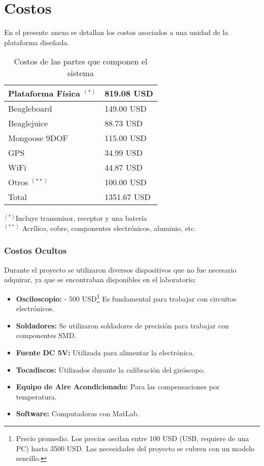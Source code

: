 \documentclass[main]{subfiles}
\begin{document}
\chapter{Costos}
\label{chap:anexo_costos}
En el presente anexo se detallan los costos asociados a una unidad de la plataforma dise\~nada. 

\begin{table}[H]
\begin{center}
\begin{tabular}{|p{5cm}|p{3cm}|}
\hline
Plataforma F\'isica $^{(*)}$  & 819.08 USD  \\
\hline
Beagleboard & 149.00 USD \\
\hline
Beaglejuice & 88.73 USD\\
\hline 
Mongoose 9DOF & 115.00 USD\\
\hline
GPS & 34.99 USD\\
\hline
WiFi & 44.87 USD\\
\hline
Otros $^{(**)}$ & 100.00 USD\\
\hline
Total & 1351.67 USD \\
\hline
\end{tabular}
\label{tab:acc-anexo}
\end{center}
\begin{center}
$^{(*)}$Incluye transmisor, receptor y una bater\'ia\\
$^{(**)}$ Acr\'ilico, cobre, componentes electr\'onicos, aluminio, etc.
\end{center}
\caption{Costos de las partes que componen el sistema}
\end{table}

\subsection{Costos Ocultos}
\label{sec:anexo_costos-costos-ocultos}

Durante el proyecto se utilizaron diversos dispositivos que no fue necesario adquirar, ya que se encontraban disponibles en el laboratorio:

\begin{itemize}
\item \textbf{Osciloscopio:} - 500 USD\footnote{Precio promedio. Los precios oscilan entre 100 USD (USB, requiere de una PC) hasta 3500 USD. Las necesidades del proyecto se cubren con un modelo sencillo.} Es fundamental para trabajar con circuitos electrónicos.
\item \textbf{Soldadores:} Se utilizaron soldadores de precisión para trabajar con componentes SMD.
\item \textbf{Fuente DC 5V:} Utilizada para alimentar la electrónica.
\item \textbf{Tocadiscos:} Utilizados durante la calibración del giróscopo.
\item \textbf{Equipo de Aire Acondicionado:} Para las compensaciones por temperatura.
\item \textbf{Software:} Computadoras con MatLab.
\end{itemize}
\end{document}
